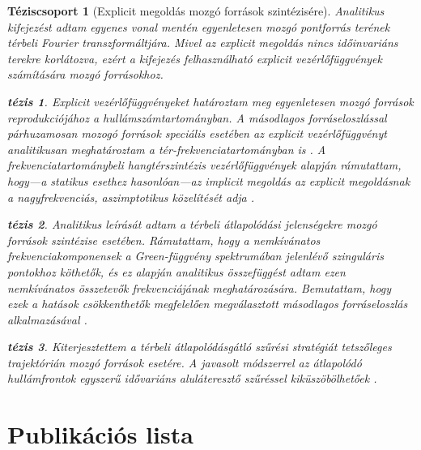 \documentclass[10pt,twoside]{article}
\theoremstyle{thesisgroupstyle}
\newtheorem{thesisgroup}{Téziscsoport}
\theoremstyle{indented}
\newtheorem{thesis}{tézis}[thesisgroup]
\begin{document}
\begin{thesisgroup}[Explicit megoldás mozgó források szintézisére]
Analitikus kifejezést adtam egyenes vonal mentén egyenletesen mozgó pontforrás terének térbeli Fourier transzformáltjára.
Mivel az explicit megoldás nincs időinvariáns terekre korlátozva, ezért a kifejezés felhasználható explicit vezérlőfüggvények számítására mozgó forrásokhoz.
\begin{thesis} 
Explicit vezérlőfüggvényeket határoztam meg egyenletesen mozgó források reprodukciójához a hullámszámtartományban.
A másodlagos forráseloszlással párhuzamosan mozogó források speciális esetében az explicit vezérlőfüggvényt analitikusan meghatároztam a tér-frekvenciatartományban is \cite{Firtha2014:daga_booklet, Firtha2014:isma_booklet, firtha2015sound_booklet}.
A frekvenciatartománybeli hangtérszintézis vezérlőfüggvények alapján rámutattam, hogy---a statikus esethez hasonlóan---az implicit megoldás az explicit megoldásnak a nagyfrekvenciás, aszimptotikus közelítését adja \cite{firtha2015sound_booklet}. 
\end{thesis}
\begin{thesis}
Analitikus leírását adtam a térbeli átlapolódási jelenségekre mozgó források szintézise esetében.
Rámutattam, hogy a nemkívánatos frekvenciakomponensek a Green-függvény spektrumában jelenlévő szinguláris pontokhoz köthetők, és ez alapján analitikus összefüggést adtam ezen nemkívánatos összetevők frekvenciájának meghatározására.
Bemutattam, hogy ezek a hatások csökkenthetők megfelelően megválasztott másodlagos forráseloszlás alkalmazásával \cite{firtha2016:daga_booklet}.
\end{thesis}
\begin{thesis} 
Kiterjesztettem a térbeli átlapolódásgátló szűrési stratégiát tetszőleges trajektórián mozgó források esetére.
A javasolt módszerrel az átlapolódó hullámfrontok egyszerű idővariáns aluláteresztő szűréssel kiküszöbölhetőek \cite{Firtha2018_daga_moving_source_booklet}.
\end{thesis}
\end{thesisgroup} 
\clearpage

\section*{Publikációs lista}

\nocite{*}
\begin{refcontext}[labelprefix=J]
\printbibliography[title={Folyóiratcikkek}, keyword=J, heading=subbibliography] 
\end{refcontext}
\begin{refcontext}[labelprefix=C]
\printbibliography[title={Konferenciaközlemények}, keyword=C, heading=subbibliography] 
\end{refcontext}
\begin{refcontext}[labelprefix=O]
\printbibliography[title={Egyéb publikációk}, keyword=O, heading=subbibliography] 
\end{refcontext}
\end{document}

